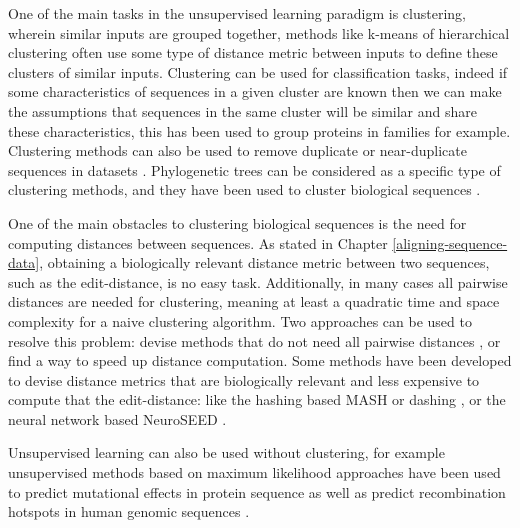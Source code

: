 \documentclass[
  11pt,
  twoside,
  BCOR=10mm,
  listof=totoc]{scrbook}
\begin{document}
One of the main tasks in the unsupervised learning paradigm is clustering, wherein similar inputs are grouped together, methods like k-means of hierarchical clustering \autocite{hastieElementsStatisticalLearning2009} often use some type of distance metric between inputs to define these clusters of similar inputs. Clustering can be used for classification tasks, indeed if some characteristics of sequences in a given cluster are known then we can make the assumptions that sequences in the same cluster will be similar and share these characteristics, this has been used to group proteins in families \autocite{kriventsevaClusteringAnalysisProtein2001} for example. Clustering methods can also be used to remove duplicate or near-duplicate sequences in datasets \autocite{fuCDHITAcceleratedClustering2012}. Phylogenetic trees can be considered as a specific type of clustering methods, and they have been used to cluster biological sequences \autocite{balabanTreeClusterClusteringBiological2019}.

One of the main obstacles to clustering biological sequences is the need for computing distances between sequences. As stated in Chapter \ref{aligning-sequence-data}, obtaining a biologically relevant distance metric between two sequences, such as the edit-distance, is no easy task. Additionally, in many cases all pairwise distances are needed for clustering, meaning at least a quadratic time and space complexity for a naive clustering algorithm. Two approaches can be used to resolve this problem: devise methods that do not need all pairwise distances \autocite{zoritaStarcodeSequenceClustering2015}, or find a way to speed up distance computation. Some methods have been developed to devise distance metrics that are biologically relevant and less expensive to compute that the edit-distance: like the hashing based MASH \autocite{ondovMashFastGenome2016} or dashing \autocite{bakerDashingFastAccurate2019}, or the neural network based NeuroSEED \autocite{corsoNeuralDistanceEmbeddings2021}.

Unsupervised learning can also be used without clustering, for example unsupervised methods based on maximum likelihood approaches have been used to predict mutational effects in protein sequence \autocite{hopfMutationEffectsPredicted2017} as well as predict recombination hotspots in human genomic sequences \autocite{castroModelSelectionApproach2018}.
\end{document}
